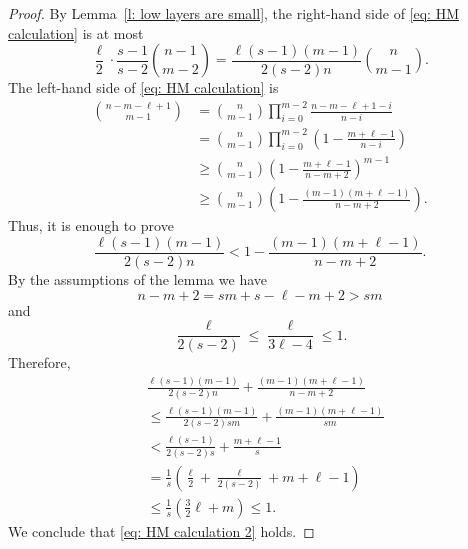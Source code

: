 \documentclass[10pt,a4paper]{amsart}
\begin{document}
\begin{proof}
    By Lemma~\ref{l: low layers are small}, the right-hand side of \eqref{eq: HM calculation} is at most
    \[
    \frac{\ell}{2}\cdot\frac{s-1}{s-2}{n - 1 \choose m - 2}
    = \frac{\ell(s-1)(m-1)}{2(s-2)n}{n \choose m - 1}.
    \]
    The left-hand side of \eqref{eq: HM calculation} is
    \begin{align*}
        {n - m - \ell + 1 \choose m - 1}
        &= {n \choose m - 1}\prod_{i=0}^{m-2}\frac{n-m-\ell+1-i}{n-i} \\
        &= {n \choose m - 1}\prod_{i=0}^{m-2}\left(1-\frac{m+\ell-1}{n-i}\right) \\
        &\geq {n \choose m - 1} \left(1-\frac{m+\ell-1}{n-m+2} \right)^{m-1} \\
        &\geq {n \choose m - 1}\left(1 - \frac{(m-1)(m+\ell-1)}{n-m+2} \right).
    \end{align*}
    Thus, it is enough to prove
    \begin{equation} \label{eq: HM calculation 2}
        \frac{\ell(s-1)(m-1)}{2(s-2)n} < 1 - \frac{(m-1)(m+\ell-1)}{n-m+2}.
    \end{equation}
    By the assumptions of the lemma we have
    \[
    n - m + 2 = sm + s - \ell - m + 2 > sm
    \]
    and
    \[
    \frac{\ell}{2(s-2)} \leq \frac{\ell}{3\ell-4} \leq 1.
    \]
    Therefore,
{\small
    \begin{align*}
        &\frac{\ell(s-1)(m-1)}{2(s-2)n} + \frac{(m-1)(m+\ell-1)}{n-m+2} \\
        &\leq \frac{\ell(s-1)(m-1)}{2(s-2)sm} + \frac{(m-1)(m+\ell-1)}{sm} \\
        &< \frac{\ell(s-1)}{2(s-2)s} + \frac{m+\ell-1}{s} \\
        &= \frac{1}{s}\left(\frac{\ell}{2} + \frac{\ell}{2(s-2)} + m + \ell - 1\right) \\
        &\leq \frac{1}{s}\left(\frac{3}{2}\ell + m\right) \leq 1.
    \end{align*}
}
    We conclude that \eqref{eq: HM calculation 2} holds.
\end{proof}
\end{document}
